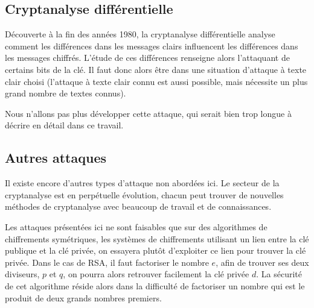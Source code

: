 \subsection{Cryptanalyse différentielle}
Découverte à la fin des années 1980, la cryptanalyse
différentielle analyse comment les différences dans les messages
clairs influencent les différences dans les messages chiffrés.
L'étude de ces différences renseigne alors l'attaquant de certains
bits de la clé. Il
faut donc alors être dans une situation d'attaque à texte clair
choisi (l'attaque à texte clair connu est aussi possible, mais
nécessite un plus grand nombre de textes connus). 

Nous n'allons pas plus développer cette attaque, qui serait bien
trop longue à décrire en détail dans ce travail.


\subsection{Autres attaques}
Il existe encore d'autres types d'attaque non abordées ici. Le
secteur de la cryptanalyse est en perpétuelle évolution, chacun
peut trouver de nouvelles méthodes de crypt\-analyse avec beaucoup
de travail et de connaissances.

Les attaques présentées ici ne sont faisables que sur des
algorithmes de chiffrements symétriques, les systèmes de
chiffrements utilisant un lien entre la clé publique et la clé
privée, on essayera plutôt d'exploiter ce lien pour trouver la
clé privée. Dans le cas de RSA, il faut factoriser le nombre $e$,
afin de trouver ses deux diviseurs, $p$ et $q$, on pourra alors
retrouver facilement la clé privée $d$. La sécurité de cet
algorithme réside alors dans la difficulté de factoriser un nombre
qui est le produit de deux grands nombres premiers.

